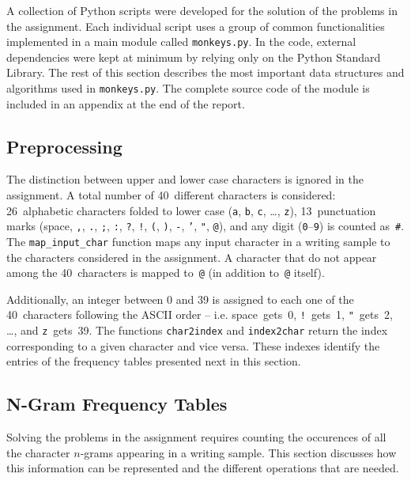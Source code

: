 \documentclass[conference]{IEEEtran}
\newcommand{\codeinline}[1]{{\fontsize{8}{0}\selectfont\texttt{#1}}}
\begin{document}
A collection of Python scripts were developed for the solution of the problems in the assignment.
Each individual script uses a group of common functionalities implemented in a main module called \codeinline{monkeys.py}.
In the code, external dependencies were kept at minimum by relying only on the Python Standard Library.
The rest of this section describes the most important data structures and algorithms used in \codeinline{monkeys.py}.
The complete source code of the module is included in an appendix at the end of the report.

\subsection{Preprocessing}

The distinction between upper and lower case characters is ignored in the assignment.
A total number of 40~different characters is considered: 
26~alphabetic characters folded to lower case (\codeinline{a}, \codeinline{b}, \codeinline{c}, \ldots, \codeinline{z}), 
13~punctuation marks (space, \codeinline{,}, \codeinline{.}, \codeinline{;}, \codeinline{:}, \codeinline{?}, \codeinline{!}, \codeinline{(}, \codeinline{)}, \codeinline{-}, \codeinline{'}, \codeinline{"}, \codeinline{@}),
and any digit (\codeinline{0}--\codeinline{9}) is counted as~\codeinline{\#}.
The \codeinline{map\_input\_char} function maps any input character in a writing sample to the characters considered in the assignment.
A character that do not appear among the 40~characters is mapped to~\codeinline{@} (in addition to~\codeinline{@} itself).

Additionally, an integer between 0 and 39 is assigned to each one of the 40~characters following the ASCII order
-- i.e. space~gets~0, \codeinline{!}~gets~1, \codeinline{"}~gets~2, \ldots, and \codeinline{z}~gets~39.
The functions \codeinline{char2index} and \codeinline{index2char} return the index corresponding to a given character and vice versa.
These indexes identify the entries of the frequency tables presented next in this section.

\subsection{N-Gram Frequency Tables}

Solving the problems in the assignment requires counting the occurences of all the character $n$-grams appearing in a writing sample.
This section discusses how this information can be represented and the different operations that are needed.
\end{document}
